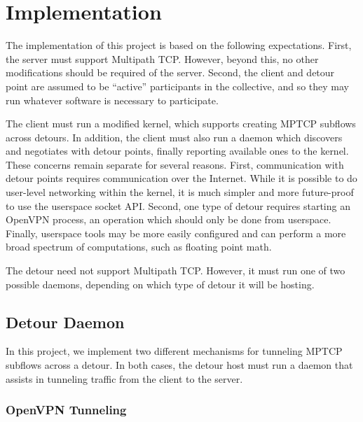 \section{Implementation}


The implementation of this project is based on the following expectations.
First, the server must support Multipath TCP. However, beyond this, no other
modifications should be required of the server. Second, the client and detour
point are assumed to be ``active'' participants in the collective, and so they
may run whatever software is necessary to participate.

The client must run a modified kernel, which supports creating MPTCP subflows
across detours. In addition, the client must also run a daemon which discovers
and negotiates with detour points, finally reporting available ones to the
kernel. These concerns remain separate for several reasons. First, communication
with detour points requires communication over the Internet. While it is
possible to do user-level networking within the kernel, it is much simpler and
more future-proof to use the userspace socket API. Second, one type of detour
requires starting an OpenVPN process, an operation which should only be done
from userspace. Finally, userspace tools may be more easily configured and can
perform a more broad spectrum of computations, such as floating point math.

The detour need not support Multipath TCP. However, it must run one of two
possible daemons, depending on which type of detour it will be hosting.

\subsection{Detour Daemon}

In this project, we implement two different mechanisms for tunneling MPTCP
subflows across a detour. In both cases, the detour host must run a daemon that
assists in tunneling traffic from the client to the server.

\subsubsection{OpenVPN Tunneling}

